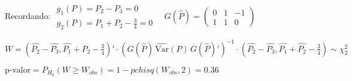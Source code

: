 Recordando:   
\(
\begin{matrix}
    g_1(P)=P_2-P_3=0 \\
    g_2(P)=P_1+P_2-\frac{3}{4}=0
\end{matrix}
\quad
G(\hat{P})=
\begin{pmatrix}
    0 & 1 & -1\\
    1 & 1 & 0
\end{pmatrix}
\)

\(
W = \left( \hat{P_2}-\hat{P_3}, \hat{P_1}+\hat{P_2}-\frac{3}{4} \right)' \cdot \left( G(\hat{P}) \, \hat{\text{Var}}(P) \, G(\hat{P})' \right)^{-1} \cdot 
\left(  \hat{P_2}-\hat{P_3}, \hat{P_1}+\hat{P_2}-\frac{3}{4} \right) \sim \chi^2_2 
\)

\(
\text{p-valor}=P_{H_0}(W \geq W_{obs})=1-pchisq(W_{obs},2)=0.36
\)











